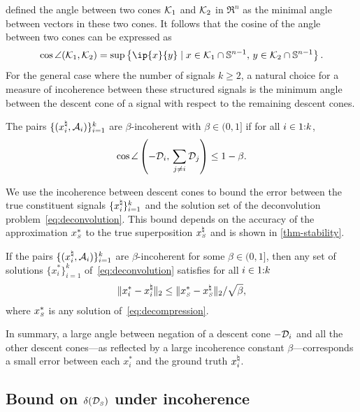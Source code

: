 \citet{obert1991angle} defined the angle between two cones $\mathcal{K}_1$ and $\mathcal{K}_2$ in $\Re^n$ as the minimal angle between vectors in these two cones. It follows that the cosine of the angle between two cones can be expressed as 
\begin{equation*}
\cos\angle(\Kscr_1, \Kscr_2) 
= \sup\left\{\ip{x}{y} \mid x \in \Kscr_1\cap\mS^{n - 1},\, y \in \Kscr_2\cap\mS^{n - 1}\right\}.
\end{equation*}
For the general case where the number of signals $k\ge2$, a natural choice for a measure of incoherence between these structured signals is the minimum angle between the descent cone of a signal with respect to the remaining descent cones. 

\begin{definition} \label{def:incoherence}
    The pairs $\{(x_i^{\natural}, \mathcal{A}_i)\}_{i=1}^k$ are $\beta$-incoherent with $\beta\in(0,1]$ if for all $i\in1\mathord{:}k$,
    \[
        \cos\angle\left({-\mathcal{D}_i},\, \sum_{j \neq i}\mathcal{D}_j\right)
        \leq 1 - \beta. 
    \]
\end{definition}

We use the incoherence between descent cones to bound the error between the true constituent signals $\{x_i^{\natural}\}_{i=1}^k$ and the solution set of the deconvolution problem~\eqref{eq:deconvolution}. This bound depends on the accuracy of the approximation $x_{\scriptscriptstyle S}^*$ to the true superposition $x_{\scriptscriptstyle S}^{\natural}$ and is shown in \autoref{thm-stability}.

\begin{proposition}\label{thm-stability} 
    If the pairs $\{(x_i^{\natural}, \mathcal{A}_i)\}_{i=1}^k$ are $\beta$-incoherent for some $\beta\in(0,1]$, then any set of solutions $\{x_i^*\}_{i=1}^k$ of~\eqref{eq:deconvolution} satisfies for all $i\in1\mathord{:}k$
    \begin{align*}
        \|x_i^* - x_i^{\natural}\|_2 \leq \|x_{\scriptscriptstyle S}^*-x_{\scriptscriptstyle S}^\natural\|_2/\sqrt{\beta},
    \end{align*}
    where $x_{\scriptscriptstyle S}^*$ is any solution of~\eqref{eq:decompression}.
\end{proposition}

In summary, a large angle between negation of a descent cone $-\mathcal{D}_i$ and all the other descent cones---as reflected by a large incoherence constant $\beta$---corresponds a small error between each $x_i^*$ and the ground truth $x_i^{\natural}$.

\subsection{Bound on \texorpdfstring{$\delta(\mathcal{D}_{\scriptscriptstyle S})$}{Ds} under incoherence}\label{sec:3-3-1}

